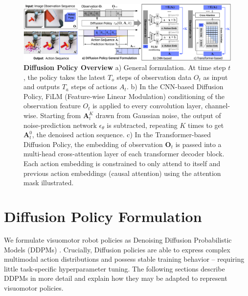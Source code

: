 \documentclass[Afour,sageh,times]{sagej}
\begin{document}
\begin{figure}[t]
    \centering
    \includegraphics[width=\linewidth]{figure/policy_input_output.pdf}
    \caption{\textbf{Diffusion Policy Overview} \label{fig:policy_io} a) General formulation. At time step $t$, the policy takes the latest $T_o$ steps of observation data $O_t$ as input and outputs $T_a$ steps of actions $A_t$.  b) In the CNN-based Diffusion Policy, FiLM (Feature-wise Linear Modulation) \cite{perez2018film} conditioning of the observation feature $O_t$ is applied to every convolution layer, channel-wise. Starting from $\mathbf{A}^K_t$ drawn from Gaussian noise, the output of noise-prediction network $\epsilon_\theta$ is subtracted, repeating $K$ times to get $\mathbf{A}^0_t$, the denoised action sequence. c) In the Transformer-based \cite{vaswani2017attention} Diffusion Policy, the embedding of observation $\mathbf{O}_t$ is passed into a multi-head cross-attention layer of each transformer decoder block. Each action embedding is constrained to only attend to itself and previous action embeddings (causal attention) using the attention mask illustrated.  }
\end{figure}

\section{Diffusion Policy Formulation}
\label{sec:method}

We formulate visuomotor robot policies as Denoising Diffusion Probabilistic Models (DDPMs) \cite{ho2020denoising}. Crucially, Diffusion policies are able to express complex multimodal action distributions and possess stable training behavior -- requiring little task-specific hyperparameter tuning.
The following sections describe DDPMs in more detail and explain how they may be adapted to represent visuomotor policies. 
\end{document}
